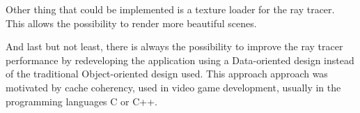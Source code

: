 \par
Other thing that could be implemented is a texture loader for the ray tracer.
This allows the possibility to render more beautiful scenes.

\par
And last but not least, there is always the possibility to improve the ray tracer performance by redeveloping the application using a 
Data-oriented design instead of the traditional Object-oriented design used.
This approach approach was motivated by cache coherency, used in video game development, usually in the programming languages C or C++.